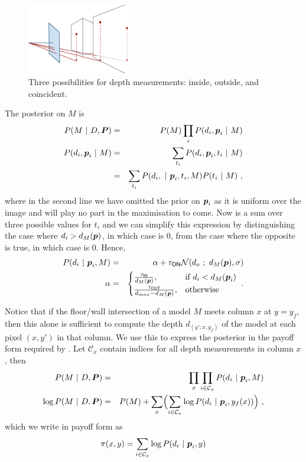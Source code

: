 \documentclass{article}
\newcommand\ColPayoff{\pi}
\newcommand\Model{M}
\newcommand\Pixel{\vect{p}}
\newcommand\Pixels{\vect{P}}
\newcommand\Depth{d}
\newcommand\Depths{D}
\newcommand\tIN{\tau_{\textsf{IN}}}
\newcommand\tOUT{\tau_{\textsf{OUT}}}
\newcommand\tON{\tau_{\textsf{ON}}}
\begin{document}
\begin{figure}[tb]
  \centering \includegraphics[width=0.4\textwidth]{figures/point-projs}
  \caption{Three possibilities for depth measurements: inside, outside, and
    coincident.}
  \label{fig:backproject}
\end{figure}

The posterior on $M$ is
\begin{eqnarray}
  \label{eq:3d-posterior}
  P(\Model~|~\Depths,\Pixels) &=& P(\Model) \prod_i P(\Depth_i,\Pixel_i~|~\Model) \\
  P(\Depth_i,\Pixel_i~|~\Model) &=& \sum_{t_i} P(\Depth_i,\Pixel_i,t_i~|~\Model) \\
  &=& \sum_{t_i} P(\Depth_i,~|~\Pixel_i,t_i,\Model) P(t_i~|~\Model) ~,
\end{eqnarray}
where in the second line we have omitted the prior on $\Pixel_i$ as it
is uniform over the image and will play no part in the maximisation to
come. Now  is a sum over three possible values
for $t_i$ and we can simplify this expression by distinguishing the
case where $d_i>d_\Model(\Pixel)$, in which case 
is $0$, from the case where the opposite is true, in which case
 is $0$. Hence,
\begin{eqnarray}
  \label{eq:3d-likelihood}
  P(\Depth_i~|~\Pixel_i,\Model) &=& \alpha +
  \tON \mathcal{N}(d_o~;~d_\Model(\Pixel),\sigma) \\
  \alpha &=&
  \begin{cases}
    \frac{\tIN}{d_\Model(\Pixel)}, & \mbox{if } d_i < d_\Model(\Pixel_i) \\
    \frac{\tOUT}{d_{max}-d_\Model(\Pixel)}, & \mbox{otherwise} \\
  \end{cases}~.
\end{eqnarray}

Notice that if the floor/wall intersection of a model $M$ meets column
$x$ at $y=y_f$, then this alone is sufficient to compute the depth
$d_(y';x,y_f)$ of the model at each pixel $(x,y')$ in that column. We
use this to express the posterior  in the payoff
form required by . Let $\mathcal{C}_x$ contain
indices for all depth measurements in column $x$, then
\begin{eqnarray}
  P(\Model ~|~ \Depths,\Pixels) &=& 
  \prod_{x} \prod_{i\in\mathcal{C}_x} P(\Depth_i~|~\Pixel_i,\Model) \\
  \log P(\Model ~|~ \Depths,\Pixels) &=& 
  P(M) + \sum_{x} \Bigl( \sum_{i\in\mathcal{C}_x}
  \log P(\Depth_i~|~\Pixel_i,y_f(x)) \Bigr) ~,
\end{eqnarray}
which we write in payoff form as
\begin{equation}
  \ColPayoff(x,y) = 
  \sum_{i\in\mathcal{C}_x} \log P(\Depth_i~|~\Pixel_i,y)
\end{equation}
\end{document}
